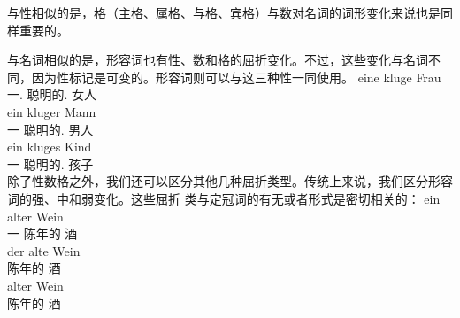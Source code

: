 与性相似的是，格（主格、属格、与格、宾格）与数对名词的词形变化来说也是同样重要的。

与名词相似的是，形容词也有性、数和格的屈折变化。不过，这些变化与名词不同，因为性标记是可变的。形容词则可以与这三种性一同使用。
\eal
\ex 
\gll eine kluge Frau\\
	 一.\fem{} 聪明的.\fem{} 女人\\
\ex 
\gll ein kluger Mann\\
	 一 聪明的.\mas{} 男人\\
\ex 
\gll ein kluges Kind\\
	 一 聪明的.\neu{} 孩子\\
\zl
除了性数格之外，我们还可以区分其他几种屈折类型\label{page-Flexionsklasse-Wunderlich}。传统上来说，我们区分形容词的强、中和弱变化。这些屈折
类与定冠词的有无或者形式是密切相关的：
\eal
\ex 
\gll ein alter Wein\\
     一 陈年的 酒\\
\ex
\gll der alte Wein\\
      陈年的 酒\\
\ex 
\gll alter Wein\\
     陈年的 酒\\
\zl

